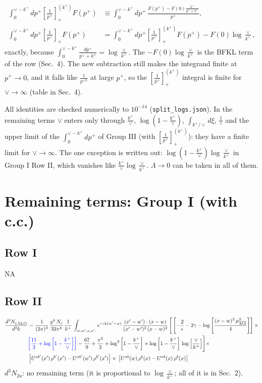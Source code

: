 \documentclass[9pt]{article}
\newcommand{\new}[1]{{\color{blue}#1}}
\numberwithin{equation}{section}
\begin{document}
\begin{itemize}
\begin{align*}
\int_0^{\vee-k^+}\!dp^+\left[\frac{1}{p^+}\right]_+^{(k^+)}F(p^+)&\equiv\int_0^{\vee-k^+}\!dp^+\,\frac{F(p^+)-F(0)\frac{k^+}{p^++k^+}}{p^+},\\
\int_0^{\vee-k^+}\!dp^+\left[\frac{1}{p^+}\right]_+F(p^+)&=\int_0^{\vee-k^+}\!dp^+\left[\frac{1}{p^+}\right]_+^{(k^+)}F(p^+)-F(0)\log\frac{\vee}{k^+},
\end{align*}
exactly, because $\int_0^{\vee-k^+}\frac{dp^+}{p^++k^+}=\log\frac{\vee}{k^+}$. The $-F(0)\log\frac{\vee}{k^+}$ is the BFKL term of the row (Sec.~4). The new subtraction still makes the integrand finite at $p^+\to0$, and it falls like $\frac{1}{p^{+2}}$ at large $p^+$, so the $\left[\frac{1}{p^+}\right]_+^{(k^+)}$ integral is finite for $\vee\to\infty$ (table in Sec.~4).
\end{itemize}
All identities are checked numerically to $10^{-14}$ (\texttt{split\_logs.json}). In the remaining terms $\vee$ enters only through $\frac{k^+}{\vee}$, $\log(1-\frac{k^+}{\vee})$, $\int_{k^+/\vee}d\xi$, $\frac{1}{\vee}$ and the upper limit of the $\int_0^{\vee-k^+}dp^+$ of Group III (with $\left[\frac{1}{p^+}\right]_+^{(k^+)}$): they have a finite limit for $\vee\to\infty$. The one exception is written out: $\log(1-\frac{k^+}{\vee})\log\frac{\vee}{k^+}$ in Group I Row II, which vanishes like $\frac{k^+}{\vee}\log\frac{\vee}{k^+}$. $\Lambda\to0$ can be taken in all of them.
\section{Remaining terms: Group I (with c.c.)}
\subsection{Row I}
\textsc{NA}
\subsection{Row II}
\begin{align}
     \frac{d^{3}N_{1\,\rm NLO}^{\rm}}{d^{3}k} &  = \frac{1}{(2\pi)^{3}}\, \frac{g^{4}\,N_{c}}{32\pi^{4}}\,\frac{1}{k^{+}}\, \int_{w, w',x,x',} e^{-ik(w^\prime-w)}\, \frac{(x'-w')\cdot (x-w)}{(x'-w')^{2}\, (x-w)^{2}}\, \Bigg[\left[-\frac{2}{\epsilon}-2\gamma-\log{\left[\frac{(x-w)^{2}\,\mu^{2}_{\overline{MS}}}{4}\right]}\right]\times \notag \\ & \new{\left[\frac{11}{3}+\log{\left[1-\frac{k^{+}}{\vee}\right]}\right]}-\frac{67}{9}+\frac{\pi^{2}}{3}+\log^{2}{\left[1-\frac{k^{+}}{\vee}\right]}+\log{\left[1-\frac{k^{+}}{\vee}\right]}\,\log{\left[\frac{\vee}{k^{+}}\right]}\Bigg]\times\notag \\ & \left[U^{ab'}(x')\,\rho^{b'}(x') - U^{ab'}(w')\,\rho^{b'}(x')\right]\times\,\left[U^{ab}(w)\,\rho^{b}(x) - U^{ab}(x)\,\rho^{b}(x)\right]
\end{align}
\new{$d^3N_{2a}$: no remaining term (it is proportional to $\log\frac{\vee}{k^+}$; all of it is in Sec.~2).}
\end{document}
